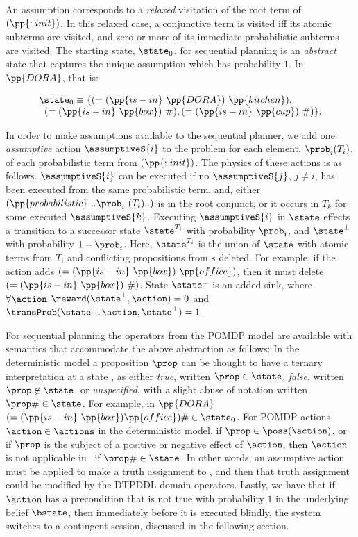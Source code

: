 \noindent An assumption corresponds to a {\em
relaxed} visitation of the root term of $(\pp{:init})$. In this
relaxed case, a conjunctive term is visited iff its atomic subterms
are visited, and zero or more of its immediate probabilistic subterms
are visited. The starting state, $\state_0$, for sequential planning
is an {\em abstract} state that captures the unique assumption which
has probability $1$. In $\pp{DORA}$, that is:

\[
\begin{array}{l}
\state_0 \equiv \{(=(\pp{is-in}~\pp{DORA})~\pp{kitchen}),\\
\;\;(=(\pp{is-in}~\pp{box})~\#), (=(\pp{is-in}~\pp{cup})~\#)\}.
\end{array}
\]

In order to make assumptions available to the sequential planner, we
add one {\em assumptive} action $\assumptiveS{i}$ to the problem for
each element, $\prob_i (T_i)$, of each probabilistic term from
$(\pp{:init})$. The physics of these actions is as
follows. $\assumptiveS{i}$ can be executed if no $\assumptiveS{j}$,
$j \neq i$, has been executed from the same probabilistic term, and,
either $(\pp{probabilistic}~..\prob_i~(T_i)..)$ is in the root conjunct,
or it occurs in $T_k$ for some executed $\assumptiveS{k}$.
Executing $\assumptiveS{i}$ in $\state$ effects a transition to a
successor state $\state^{T_i}$ with probability $\prob_i$, and
$\state^\bot$ with probability $1 - \prob_i$. Here, $\state^{T_i}$ is
the union of $\state$ with atomic terms from $T_i$ and conflicting
propositions from $s$ deleted. For example, if the action adds
$(=(\pp{is-in}~\pp{box})~\pp{office})$, then it must delete
$(=(\pp{is-in}~\pp{box})~\#)$. State $\state^\bot$ is an added sink,
where $\forall\action$ $\reward(\state^\bot, \action) = 0$
and $\transProb(\state^\bot, \action, \state^\bot) = 1$.

For sequential planning the operators from the POMDP model are
available with semantics that accommodate the above abstraction as
follows: In the deterministic model a proposition $\prop$ can be
thought to have a ternary interpretation at a state \state, as either
{\em true}, written $\prop\in\state$, {\em false}, written
$\prop\not\in\state$, or {\em unspecified}, with a slight abuse of
notation written $\prop\#\in\state$. For example, in $\pp{DORA}$
$(=(\pp{is-in}~\pp{box})\pp{office})\#\in\state_0$. For POMDP actions
$\action\in\actions$ in the deterministic model, if
$\prop \in \poss(\action)$, or if $\prop$ is the subject of a positive
or negative effect of $\action$, then $\action$ is not applicable
in \state\ if $\prop\#\in\state$. In other words, an assumptive action
must be applied to make a truth assignment to \prop, and then that
truth assignment could be modified by the DTPDDL domain operators.
Lastly, we have that if $\action$ has a
precondition that is not true with probability $1$ in the underlying
belief $\bstate$, then immediately before it is executed blindly, the
system switches to a contingent session, discussed in the following
section.


